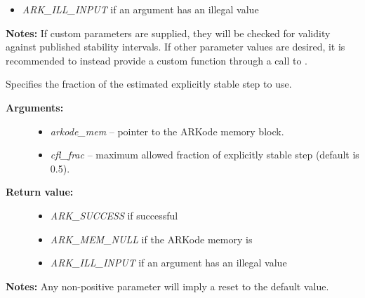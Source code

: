 \documentclass[letterpaper,10pt,english]{sphinxmanual}
\begin{document}
\begin{fulllineitems}
\begin{description}
\begin{itemize}
\item {} 
\emph{ARK\_ILL\_INPUT} if an argument has an illegal value

\end{itemize}

\end{description}

\textbf{Notes:} If custom parameters are supplied, they will be checked
for validity against published stability intervals.  If other
parameter values are desired, it is recommended to instead provide
a custom function through a call to {\hyperref[c_interface/User_callable:c.ARKodeSetAdaptivityFn]{\emph{}}}.

\end{fulllineitems}


\begin{fulllineitems}
\label{c_interface/User_callable:c.ARKodeSetCFLFraction}
Specifies the fraction of the estimated explicitly stable step to use.
\begin{description}
\item[{\textbf{Arguments:}}] \leavevmode\begin{itemize}
\item {} 
\emph{arkode\_mem} -- pointer to the ARKode memory block.

\item {} 
\emph{cfl\_frac} -- maximum allowed fraction of explicitly stable step (default is 0.5).

\end{itemize}

\item[{\textbf{Return value:}}] \leavevmode\begin{itemize}
\item {} 
\emph{ARK\_SUCCESS} if successful

\item {} 
\emph{ARK\_MEM\_NULL} if the ARKode memory is 

\item {} 
\emph{ARK\_ILL\_INPUT} if an argument has an illegal value

\end{itemize}

\end{description}

\textbf{Notes:} Any non-positive parameter will imply a reset to the default
value.

\end{fulllineitems}
\end{document}
